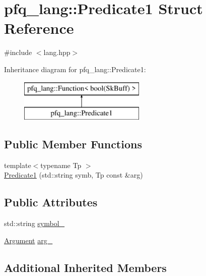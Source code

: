 \hypertarget{structpfq__lang_1_1Predicate1}{\section{pfq\+\_\+lang\+:\+:Predicate1 Struct Reference}
\label{structpfq__lang_1_1Predicate1}
}


{\ttfamily \#include $<$lang.\+hpp$>$}

Inheritance diagram for pfq\+\_\+lang\+:\+:Predicate1\+:\begin{figure}[H]
\begin{center}
\leavevmode
\includegraphics[height=2.000000cm]{structpfq__lang_1_1Predicate1}
\end{center}
\end{figure}
\subsection*{Public Member Functions}
\begin{DoxyCompactItemize}
\item 
{\footnotesize template$<$typename Tp $>$ }\\\hyperlink{structpfq__lang_1_1Predicate1_a18e5c94ef3de56bc383a1163900e8677}{Predicate1} (std\+::string symb, Tp const \&arg)
\end{DoxyCompactItemize}
\subsection*{Public Attributes}
\begin{DoxyCompactItemize}
\item 
std\+::string \hyperlink{structpfq__lang_1_1Predicate1_a1753b4b7aa7045934989a4b24a6fbd36}{symbol\+\_\+}
\item 
\hyperlink{structpfq__lang_1_1Argument}{Argument} \hyperlink{structpfq__lang_1_1Predicate1_a6691bf8b92a93edf9dc77bb6b54b51d5}{arg\+\_\+}
\end{DoxyCompactItemize}
\subsection*{Additional Inherited Members}


